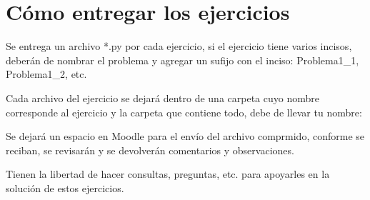 \section*{Cómo entregar los ejercicios}
Se entrega un archivo *.py por cada ejercicio, si el ejercicio tiene varios incisos, deberán de nombrar el problema y agregar un sufijo con el inciso: Problema1\_1, Problema1\_2, etc.
\par
Cada archivo del ejercicio se dejará dentro de una carpeta cuyo nombre corresponde al ejercicio y la carpeta que contiene todo, debe de llevar tu nombre:
\par
{}
Se dejará un espacio en Moodle para el envío del archivo comprmido, conforme se reciban, se revisarán y se devolverán comentarios y observaciones.
\par
Tienen la libertad de hacer consultas, preguntas, etc. para apoyarles en la solución de estos ejercicios.
